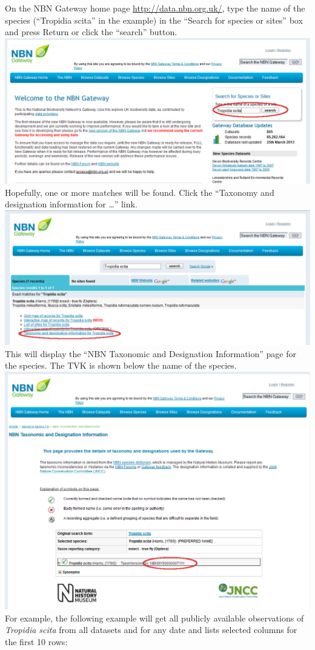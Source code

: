 \documentclass{article}
\begin{document}
On the NBN Gateway home page \url{http://data.nbn.org.uk/}, type the
name of the species (``Tropidia scita'' in the example) in the ``Search for
species or sites'' box and press Return or click the ``search'' button.
\\[20pt]
\includegraphics[width=1\textwidth]{NBN_search.png}
\\[12pt]
Hopefully, one or more matches will be found. Click the ``Taxonomy and
designation information for \ldots'' link.
\\[20pt]
\includegraphics[width=1\textwidth]{NBN_search_result.png}
\\[12pt]
This will display the ``NBN Taxonomic and Designation Information'' page
for the species. The TVK is shown below the name of the species.
\\[20pt]
\includegraphics[width=1\textwidth]{NBN_species_taxonomy.png}
\\[12pt]
For example, the following example will get all publicly available observations
of \emph{Tropidia scita} from all datasets and for any date and lists selected
columns for the first 10 rows:
\end{document}
